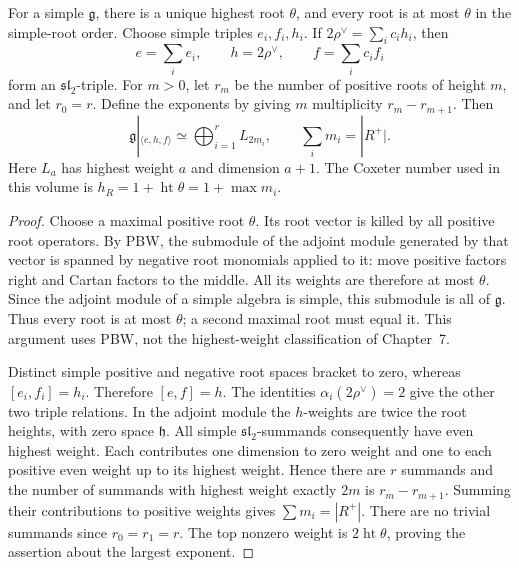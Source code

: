 \begin{theorem}\label{res:E09}
For a simple \(\mathfrak g\), there is a unique highest root
\(\theta\), and every root is at most \(\theta\) in the
simple-root order. Choose simple triples \(e_i,f_i,h_i\).
If \(2\rho^\vee=\sum_i c_i h_i\), then
\[
 e=\sum_i e_i,\qquad h=2\rho^\vee,\qquad f=\sum_i c_i f_i
\]
form an \(\mathfrak{sl}_2\)-triple.
For \(m>0\), let \(r_m\) be the number of positive roots of
height \(m\), and let \(r_0=r\). Define the exponents by
giving \(m\) multiplicity \(r_m-r_{m+1}\). Then
\[
 \mathfrak g|_{\langle e,h,f\rangle}
       \simeq\bigoplus_{i=1}^r L_{2m_i},\qquad
 \sum_i m_i=|R^+|.
\]
Here \(L_a\) has highest weight \(a\) and dimension \(a+1\).
The Coxeter number used in this volume is
\(h_R=1+\operatorname{ht}\theta=1+\max m_i\).
\end{theorem}
\begin{proof}
Choose a maximal positive root \(\theta\).
Its root vector is killed by all positive root operators.
By PBW, the submodule of the adjoint module generated by
that vector is spanned by negative root monomials applied
to it: move positive factors right and Cartan factors
to the middle. All its weights are therefore at most
\(\theta\). Since the adjoint module of a simple algebra
is simple, this submodule is all of \(\mathfrak g\).
Thus every root is at most \(\theta\); a second maximal root
must equal it. This argument uses PBW, not the highest-weight
classification of Chapter~7.

Distinct simple positive and negative root spaces bracket
to zero, whereas \([e_i,f_i]=h_i\). Therefore
\([e,f]=h\). The identities
\(\alpha_i(2\rho^\vee)=2\) give the other two triple
relations. In the adjoint module the \(h\)-weights are
twice the root heights, with zero space \(\mathfrak h\).
All simple \(\mathfrak{sl}_2\)-summands consequently have
even highest weight. Each contributes one dimension to
zero weight and one to each positive even weight up to
its highest weight. Hence there are \(r\) summands and
the number of summands with highest weight exactly \(2m\)
is \(r_m-r_{m+1}\). Summing their contributions to positive
weights gives \(\sum m_i=|R^+|\).
There are no trivial summands since \(r_0=r_1=r\).
The top nonzero weight is \(2\operatorname{ht}\theta\),
proving the assertion about the largest exponent.
\end{proof}


